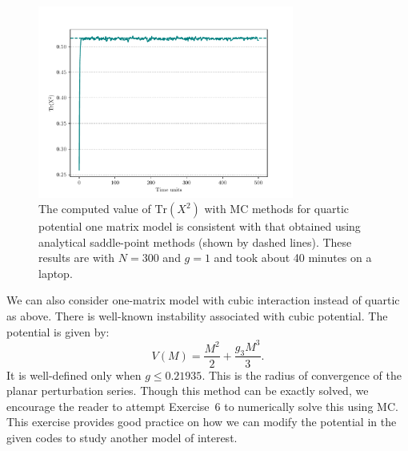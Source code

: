\documentclass[letter,11pt]{article}
\begin{document}
\begin{figure}[htbp] 
	\centering 
	\includegraphics[width=0.75\textwidth]{figs/mm_plot.pdf}
	\caption{\label{fig:1MM_res}The computed value of $\mbox{Tr}(X^2)$ with MC methods for quartic potential
		one matrix model is consistent with that obtained using analytical saddle-point methods (shown by dashed lines). 
		These results are with $N = 300$ and $g = 1$ and took about 40 minutes on a laptop.}
\end{figure}
We can also consider one-matrix model with cubic interaction instead of quartic as above. 
There is well-known instability associated with cubic potential. The potential is given by:
\begin{equation}
	V(M) = \frac{M^2}{2} + \frac{g_{3}M^3}{3}.  
\end{equation}
It is well-defined only when $g \le 0.21935$. This is the radius of convergence of the planar perturbation series. 
Though this method can be exactly solved, we encourage the reader to attempt Exercise~6 to numerically solve this using MC. This exercise provides good practice on how we can modify the potential in the given codes to study another model of interest. 
\end{document}
